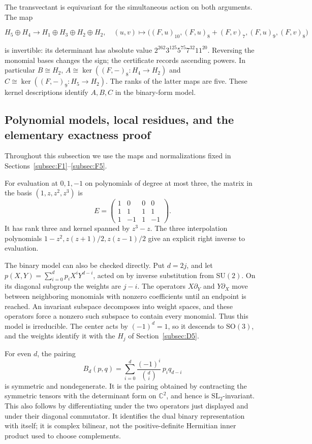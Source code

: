 \documentclass[11pt,a4paper]{article}
\begin{document}
The transvectant is equivariant for the simultaneous action on both arguments. The map

\[
H_5\oplus H_4\longrightarrow H_1\oplus H_3\oplus H_2\oplus H_2,
\quad(u,v)\longmapsto
\bigl((F,u)_{10},(F,u)_8+(F,v)_7,(F,u)_9,(F,v)_8\bigr)
\]

is invertible: its determinant has absolute value \(2^{262}3^{125}5^{75}7^{32}11^{20}\). Reversing the monomial bases changes the sign; the certificate records ascending powers. In particular \(B\cong H_2\), \(A\cong\ker((F,-)_8:H_4\to H_2)\) and \(C\cong\ker((F,-)_9:H_5\to H_2)\). The ranks of the latter maps are five. These kernel descriptions identify \(A,B,C\) in the binary-form model.

\subsection{Polynomial models, local residues, and the elementary exactness proof}\label{subsec:F6}

Throughout this subsection we use the maps and normalizations fixed in Sections~\ref{subsec:F1}--\ref{subsec:F5}.

For evaluation at \(0,1,-1\) on polynomials of degree at most three, the matrix in the basis \((1,z,z^2,z^3)\) is
\[
E=\begin{pmatrix}1&0&0&0\\1&1&1&1\\1&-1&1&-1\end{pmatrix}.
\]
It has rank three and kernel spanned by \(z^3-z\). The three interpolation polynomials \(1-z^2,z(z+1)/2,z(z-1)/2\) give an explicit right inverse to evaluation.

The binary model can also be checked directly. Put \(d=2j\), and let \(p(X,Y)=\sum_{i=0}^d p_iX^iY^{d-i}\), acted on by inverse substitution from \(\mathrm{SU}(2)\). On its diagonal subgroup the weights are \(j-i\). The operators \(X\partial_Y\) and \(Y\partial_X\) move between neighboring monomials with nonzero coefficients until an endpoint is reached. An invariant subspace decomposes into weight spaces, and these operators force a nonzero such subspace to contain every monomial. Thus this model is irreducible. The center acts by \((-1)^d=1\), so it descends to \(\mathrm{SO}(3)\), and the weights identify it with the \(H_j\) of Section~\ref{subsec:D5}.

For even \(d\), the pairing
\[
B_d(p,q)=\sum_{i=0}^d\frac{(-1)^i}{\binom di}\,p_iq_{d-i}
\]
is symmetric and nondegenerate. It is the pairing obtained by contracting the symmetric tensors with the determinant form on \(\mathbb C^2\), and hence is \(\mathrm{SL}_2\)-invariant. This also follows by differentiating under the two operators just displayed and under their diagonal commutator. It identifies the dual binary representation with itself; it is complex bilinear, not the positive-definite Hermitian inner product used to choose complements.
\end{document}
